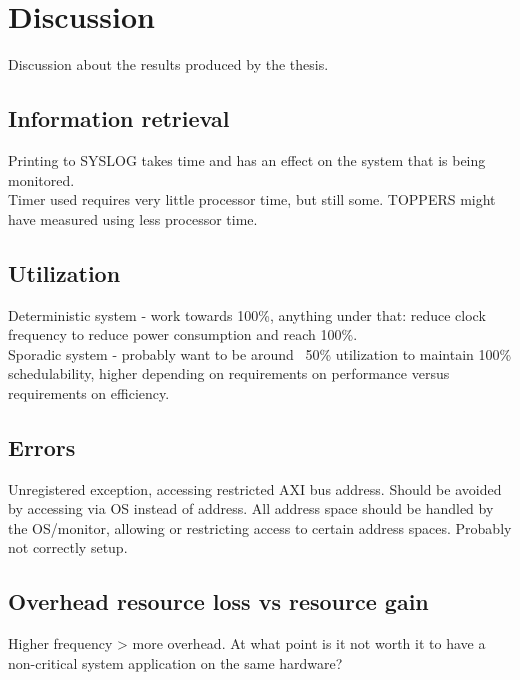 \chapter{Discussion}
Discussion about the results produced by the thesis.

\section{Information retrieval}
Printing to SYSLOG takes time and has an effect on the system that is being monitored.\\

Timer used requires very little processor time, but still some. TOPPERS might have measured using less processor time.

\section{Utilization}
Deterministic system - work towards 100\%, anything under that: reduce clock frequency to reduce power consumption and reach 100\%.\\

Sporadic system - probably want to be around ~50\% utilization to maintain 100\% schedulability, higher depending on requirements on performance versus requirements on efficiency.

\section{Errors}
Unregistered exception, accessing restricted AXI bus address. Should be avoided by accessing via OS instead of address. All address space should be handled by the OS/monitor, allowing or restricting access to certain address spaces. Probably not correctly setup.

\section{Overhead resource loss vs resource gain}
Higher frequency > more overhead. At what point is it not worth it to have a non-critical system application on the same hardware?
